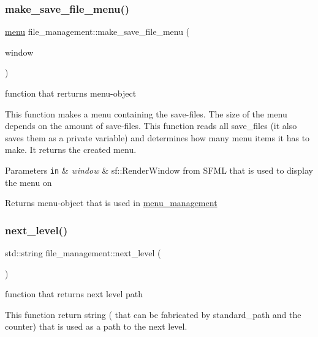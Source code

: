 \subsubsection{\texorpdfstring{make\+\_\+save\+\_\+file\+\_\+menu()}{make\_save\_file\_menu()}}
{\footnotesize\ttfamily \hyperlink{classmenu}{menu} file\+\_\+management\+::make\+\_\+save\+\_\+file\+\_\+menu (\begin{DoxyParamCaption}\item[{sf\+::\+Render\+Window \&}]{window }\end{DoxyParamCaption})}



function that rerturns menu-\/object 

This function makes a menu containing the save-\/files. The size of the menu depends on the amount of save-\/files. This function reads all save\+\_\+files (it also saves them as a private variable) and determines how many menu items it has to make. It returns the created menu.


\begin{DoxyParams}[1]{Parameters}
\mbox{\tt in}  & {\em window} & sf\+::\+Render\+Window from S\+F\+ML that is used to display the menu on\\
\hline
\end{DoxyParams}
\begin{DoxyReturn}{Returns}
menu-\/object that is used in \hyperlink{classmenu__management}{menu\+\_\+management} 
\end{DoxyReturn}
\mbox{\label{classfile__management_a75689c420580c71f0621dfbcc4c2a06f}} 
\subsubsection{\texorpdfstring{next\+\_\+level()}{next\_level()}}
{\footnotesize\ttfamily std\+::string file\+\_\+management\+::next\+\_\+level (\begin{DoxyParamCaption}{ }\end{DoxyParamCaption})}



function that returns next level path 

This function return string ( that can be fabricated by standard\+\_\+path and the counter) that is used as a path to the next level.

